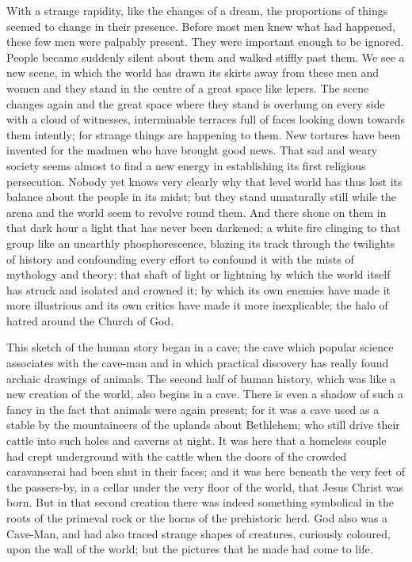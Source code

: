 With a strange rapidity, like the changes of a dream, the proportions of things seemed to change in their presence. Before most men knew what had happened, these few men were palpably present. They were important enough to be ignored. People became suddenly silent about them and walked stiffly past them. We see a new scene, in which the world has drawn its skirts away from these men and women and they stand in the centre of a great space like lepers. The scene changes again and the great space where they stand is overhung on every side with a cloud of witnesses, interminable terraces full of faces looking down towards them intently; for strange things are happening to them. New tortures have been invented for the madmen who have brought good news. That sad and weary society seems almost to find a new energy in establishing its first religious persecution. Nobody yet knows very clearly why that level world has thus lost its balance about the people in its midst; but they stand unnaturally still while the arena and the world seem to revolve round them. And there shone on them in that dark hour a light that has never been darkened; a white fire clinging to that group like an unearthly phosphorescence, blazing its track through the twilights of history and confounding every effort to confound it with the mists of mythology and theory; that shaft of light or lightning by which the world itself has struck and isolated and crowned it; by which its own enemies have made it more illustrious and its own critics have made it more inexplicable; the halo of hatred around the Church of God.



This sketch of the human story began in a cave; the cave which popular science associates with the cave-man and in which practical discovery has really found archaic drawings of animals. The second half of human history, which was like a new creation of the world, also begins in a cave. There is even a shadow of such a fancy in the fact that animals were again present; for it was a cave used as a stable by the mountaineers of the uplands about Bethlehem; who still drive their cattle into such holes and caverns at night. It was here that a homeless couple had crept underground with the cattle when the doors of the crowded caravanserai had been shut in their faces; and it was here beneath the very feet of the passers-by, in a cellar under the very floor of the world, that Jesus Christ was born. But in that second creation there was indeed something symbolical in the roots of the primeval rock or the horns of the prehistoric herd. God also was a Cave-Man, and had also traced strange shapes of creatures, curiously coloured, upon the wall of the world; but the pictures that he made had come to life.

